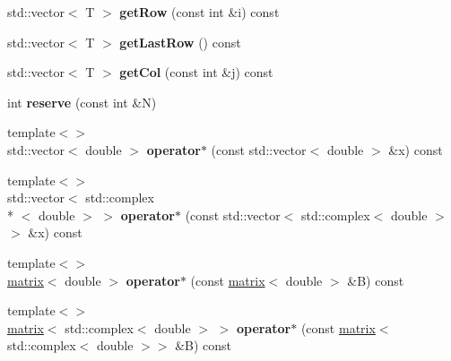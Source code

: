 \begin{DoxyCompactItemize}
\item 
\hypertarget{classkeycpp_1_1matrix_a14cad5ff7a9b3079754fc83b677208ed}{std\-::vector$<$ T $>$ {\bfseries get\-Row} (const int \&i) const }\label{classkeycpp_1_1matrix_a14cad5ff7a9b3079754fc83b677208ed}

\item 
\hypertarget{classkeycpp_1_1matrix_a20002e97217bcc6382e60694bf898e1f}{std\-::vector$<$ T $>$ {\bfseries get\-Last\-Row} () const }\label{classkeycpp_1_1matrix_a20002e97217bcc6382e60694bf898e1f}

\item 
\hypertarget{classkeycpp_1_1matrix_a9c16ead5c2a61eb35c33328caa235b2f}{std\-::vector$<$ T $>$ {\bfseries get\-Col} (const int \&j) const }\label{classkeycpp_1_1matrix_a9c16ead5c2a61eb35c33328caa235b2f}

\item 
\hypertarget{classkeycpp_1_1matrix_a719eb1cb62d0cd9168abe2235235f278}{int {\bfseries reserve} (const int \&N)}\label{classkeycpp_1_1matrix_a719eb1cb62d0cd9168abe2235235f278}

\item 
\hypertarget{classkeycpp_1_1matrix_a53aaf4f54bdbebf5664b67a440f73040}{{\footnotesize template$<$$>$ }\\std\-::vector$<$ double $>$ {\bfseries operator$\ast$} (const std\-::vector$<$ double $>$ \&x) const}\label{classkeycpp_1_1matrix_a53aaf4f54bdbebf5664b67a440f73040}

\item 
\hypertarget{classkeycpp_1_1matrix_a8a9131597beafc39a3d94b59af930756}{{\footnotesize template$<$$>$ }\\std\-::vector$<$ std\-::complex\\*
$<$ double $>$ $>$ {\bfseries operator$\ast$} (const std\-::vector$<$ std\-::complex$<$ double $>$$>$ \&x) const}\label{classkeycpp_1_1matrix_a8a9131597beafc39a3d94b59af930756}

\item 
\hypertarget{classkeycpp_1_1matrix_a0e9fdbebdf1d95dd225a2bd1310cba30}{{\footnotesize template$<$$>$ }\\\hyperlink{classkeycpp_1_1matrix}{matrix}$<$ double $>$ {\bfseries operator$\ast$} (const \hyperlink{classkeycpp_1_1matrix}{matrix}$<$ double $>$ \&B) const}\label{classkeycpp_1_1matrix_a0e9fdbebdf1d95dd225a2bd1310cba30}

\item 
\hypertarget{classkeycpp_1_1matrix_a0cbaef09170a16f74ed5acefa0f8ad3a}{{\footnotesize template$<$$>$ }\\\hyperlink{classkeycpp_1_1matrix}{matrix}$<$ std\-::complex$<$ double $>$ $>$ {\bfseries operator$\ast$} (const \hyperlink{classkeycpp_1_1matrix}{matrix}$<$ std\-::complex$<$ double $>$$>$ \&B) const}\label{classkeycpp_1_1matrix_a0cbaef09170a16f74ed5acefa0f8ad3a}

\end{DoxyCompactItemize}
